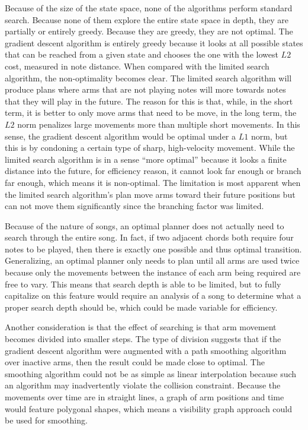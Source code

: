 \documentclass[letterpaper, 10 pt, conference]{ieeeconf}  %
\begin{document}
Because of the size of the state space, none of the algorithms perform standard search. Because none of them explore the entire state space in depth, they are partially or entirely greedy. Because they are greedy, they are not optimal. The gradient descent algorithm is entirely greedy because it looks at all possible states that can be reached from a given state and chooses the one with the lowest $L2$ cost, measured in note distance. When compared with the limited search algorithm, the non-optimality becomes clear. The limited search algorithm will produce plans where arms that are not playing notes will more towards notes that they will play in the future. The reason for this is that, while, in the short term, it is better to only move arms that need to be move, in the long term, the $L2$ norm penalizes large movements more than multiple short movements. In this sense, the gradient descent algorithm would be optimal under a $L1$ norm, but this is by condoning a certain type of sharp, high-velocity movement. While the limited search algorithm is in a sense ``more optimal'' because it looks a finite distance into the future, for efficiency reason, it cannot look far enough or branch far enough, which means it is non-optimal. The limitation is most apparent when the limited search algorithm's plan move arms toward their future positions but can not move them significantly since the branching factor was limited.

Because of the nature of songs, an optimal planner does not actually need to search through the entire song. In fact, if two adjacent chords both require four notes to be played, then there is exactly one possible and thus optimal transition. Generalizing, an optimal planner only needs to plan until all arms are used twice because only the movements between the instance of each arm being required are free to vary. This means that search depth is able to be limited, but to fully capitalize on this feature would require an analysis of a song to determine what a proper search depth should be, which could be made variable for efficiency.

Another consideration is that the effect of searching is that arm movement becomes divided into smaller steps. The type of division suggests that if the gradient descent algorithm were augmented with a path smoothing algorithm over inactive arms, then the result could be made close to optimal. The smoothing algorithm could not be as simple as linear interpolation because such an algorithm may inadvertently violate the collision constraint. Because the movements over time are in straight lines, a graph of arm positions and time would feature polygonal shapes, which means a visibility graph approach could be used for smoothing.
\end{document}
